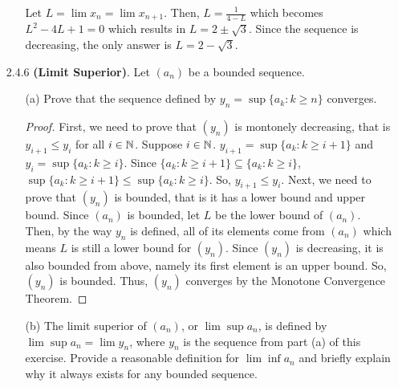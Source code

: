 \documentclass[12pt,letterpaper]{article}
\begin{document}
\begin{itemize}[leftmargin=!,labelindent=5pt]
\begin{itemize}
                Let $L = \lim x_n = \lim x_{n+1}$.
                Then, $L = \frac{1}{4-L}$ which becomes $L^2 - 4L + 1 = 0$ which results in $L = 2\pm \sqrt{3}$.
                Since the sequence is decreasing, the only answer is $L = 2 - \sqrt{3}$.
        \end{itemize}
    \item [2.4.6] \textbf{(Limit Superior)}. Let $(a_n)$ be a bounded sequence.
        \begin{itemize}
            \item [(a)] Prove that the sequence defined by $y_n = \sup\{a_k : k \geq n\}$ converges.
                \begin{proof}
                    First, we need to prove that $(y_n)$ is montonely decreasing, that is $y_{i+1} \leq y_i$ for all $i \in \mathbb{N}$.
                    Suppose $i \in \mathbb{N}$.
                    $y_{i+1} = \sup \{a_k : k \geq i+1\}$ and $y_{i} = \sup \{a_k : k \geq i\}$.
                    Since $\{a_k : k \geq i+1\} \subseteq \{a_k : k \geq i\}$, $\sup \{a_k : k \geq i+1\} \leq \sup \{a_k : k \geq i\}$.
                    So, $y_{i+1} \leq y_i$.
                    Next, we need to prove that $(y_n)$ is bounded, that is it has a lower bound and upper bound.
                    Since $(a_n)$ is bounded, let $L$ be the lower bound of $(a_n)$.
                    Then, by the way $y_n$ is defined, all of its elements come from $(a_n)$ which means $L$ is still a lower bound for $(y_n)$.
                    Since $(y_n)$ is decreasing, it is also bounded from above, namely its first element is an upper bound.
                    So, $(y_n)$ is bounded.
                    Thus, $(y_n)$ converges by the Monotone Convergence Theorem.
                    \end{proof}

            \item [(b)] The limit superior of $(a_n)$, or $\lim \sup a_n$, is defined by $\lim \sup a_n = \lim y_n$, where $y_n$ is the sequence from part (a) of this exercise. Provide a reasonable definition for $\lim \inf a_n$ and briefly explain why it always exists for any bounded sequence.
                

\end{itemize}
\end{itemize}
\end{document}
